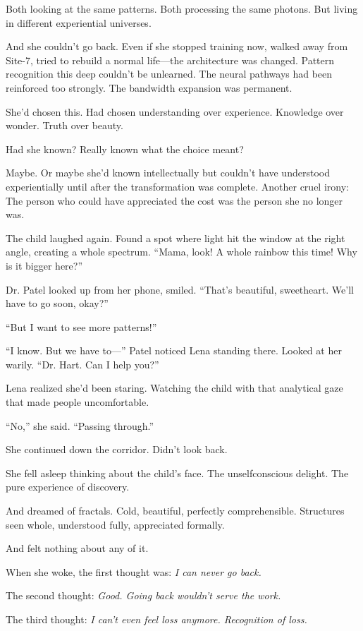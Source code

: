 Both looking at the same patterns. Both processing the same photons. But living in different experiential universes.

And she couldn't go back. Even if she stopped training now, walked away from Site-7, tried to rebuild a normal life—the architecture was changed. Pattern recognition this deep couldn't be unlearned. The neural pathways had been reinforced too strongly. The bandwidth expansion was permanent.

She'd chosen this. Had chosen understanding over experience. Knowledge over wonder. Truth over beauty.

Had she known? Really known what the choice meant?

Maybe. Or maybe she'd known intellectually but couldn't have understood experientially until after the transformation was complete. Another cruel irony: The person who could have appreciated the cost was the person she no longer was.

The child laughed again. Found a spot where light hit the window at the right angle, creating a whole spectrum. ``Mama, look! A whole rainbow this time! Why is it bigger here?''

Dr. Patel looked up from her phone, smiled. ``That's beautiful, sweetheart. We'll have to go soon, okay?''

``But I want to see more patterns!''

``I know. But we have to—'' Patel noticed Lena standing there. Looked at her warily. ``Dr. Hart. Can I help you?''

Lena realized she'd been staring. Watching the child with that analytical gaze that made people uncomfortable.

``No,'' she said. ``Passing through.''

She continued down the corridor. Didn't look back.

She fell asleep thinking about the child's face. The unselfconscious delight. The pure experience of discovery.

And dreamed of fractals. Cold, beautiful, perfectly comprehensible. Structures seen whole, understood fully, appreciated formally.

And felt nothing about any of it.

When she woke, the first thought was: \textit{I can never go back.}

The second thought: \textit{Good. Going back wouldn't serve the work.}

The third thought: \textit{I can't even feel loss anymore. Recognition of loss.}

